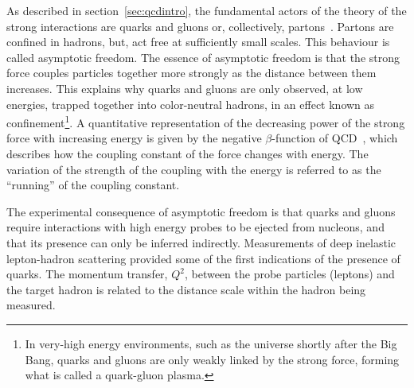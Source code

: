 As described in section~\ref{sec:qcdintro}, the fundamental actors of the theory of the strong interactions are quarks and gluons or, collectively, partons~\cite{PhysRevLett.23.1415}. Partons are confined in  %
hadrons, but, act free at sufficiently small scales. This behaviour is called asymptotic freedom. The essence of asymptotic freedom is that the strong force couples particles together more strongly as the distance between them increases. This explains why quarks and gluons are only observed, at low energies, trapped together into color-neutral hadrons, in an effect known as confinement\footnote{In very-high energy environments, such as the universe shortly after the Big Bang, quarks and gluons are only weakly linked by the strong force, forming what is called a quark-gluon plasma.}.  A quantitative representation of the decreasing power of the strong force with increasing energy is given by the negative $\beta$-function of QCD~\cite{PhysRevLett.30.1346,PhysRevLett.30.1343}, 
which describes how the coupling constant of the force changes with energy. The variation of the strength of the coupling with the energy is referred to as the ``running'' of the coupling constant.

The experimental consequence of asymptotic freedom is that quarks and gluons require interactions with high energy probes to be ejected from nucleons, and %
that its presence can only be inferred indirectly.
Measurements of deep inelastic lepton-hadron scattering provided some of the first indications of the presence of quarks. The momentum transfer, $Q^2$, between the probe particles (leptons) and the target hadron is related to the distance scale within the hadron being measured. 


